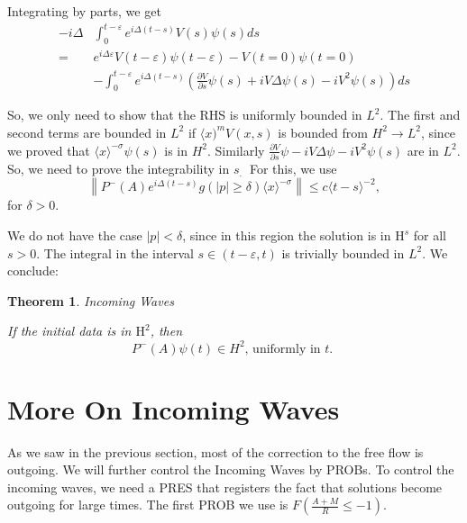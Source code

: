 \documentclass[11pt]{article}
\newtheorem{theorem}{Theorem}[section]
\begin{document}
Integrating by parts, we get
$$
\begin{aligned}
-i \Delta & \int_{0}^{t-\varepsilon} e^{i \Delta(t-s)} V(s) \psi(s) d s \\
= & e^{i \Delta \varepsilon} V(t-\varepsilon) \psi(t-\varepsilon)-V(t=0) \psi(t=0) \\
& -\int_{0}^{t-\varepsilon} e^{i \Delta(t-s)}\left(\frac{\partial V}{\partial s} \psi(s)+i V \Delta \psi(s)-i V^{2} \psi(s)\right) d s
\end{aligned}
$$

So, we only need to show that the RHS is uniformly bounded in $L^{2}$.
The first and second terms are bounded in $L^{2}$ if $\langle x)^{m} V(x, s)$ is bounded from $H^{2} \rightarrow L^{2}$, since we proved that $\langle x\rangle^{-\sigma} \psi(s)$ is in $H^{2}$. Similarly $\frac{\partial V}{\partial s} \psi-i V \Delta \psi-i V^{2} \psi(s)$ are in $L^{2}$. So, we need to prove the integrability in $s_{\text {. }}$
For this, we use
$$
\left\|P^{-}(A) e^{i \Delta(t-s)} g(|p|\geq \delta)\langle x\rangle^{-\sigma}\right\| \leqslant c\langle t-s\rangle^{-2},
$$
for $\delta>0$.




We do not have the case $|p|<\delta$, since in this region the solution is in $\mathrm{H}^{s}$ for all $s>0$.
The integral in the interval $s \in(t-\varepsilon, t)$ is trivially bounded in $L^{2}$. We conclude:

\begin{theorem} {Incoming Waves}

If the initial data is in $\mathrm{H}^{2}$, then
\begin{equation}\label{In-Reg}
P^{-}(A) \psi(t) \in H^{2} \text {, uniformly in } t \text {. }
\end{equation}
\end{theorem}


\section{More On Incoming Waves}

As we saw in the previous section, most of the correction to the free flow is outgoing. We will further control the Incoming Waves by PROBs.
To control the incoming waves, we need a PRES that registers the fact that solutions become outgoing for large times.
The first PROB we use is $F\left(\frac{A+M}{R} \leq-1\right)$.
\end{document}
